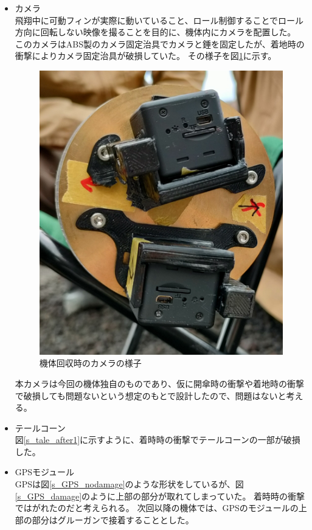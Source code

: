 \documentclass[a4paper,11pt,titlepage,uplatex]{jsarticle}
\begin{document}
\begin{itemize}
    \\
    \item カメラ\\
    飛翔中に可動フィンが実際に動いていること、ロール制御することでロール方向に回転しない映像を撮ることを目的に、機体内にカメラを配置した。
    このカメラはABS製のカメラ固定治具でカメラと錘を固定したが、着地時の衝撃によりカメラ固定治具が破損していた。
    その様子を図\ref{s_tyakuti_camera}に示す。
    \begin{figure}[H]
        \centering
        \includegraphics[scale = 0.1]{pic_str/s_tyakuti_camera.jpg}
        \caption{機体回収時のカメラの様子}
        \label{s_tyakuti_camera}
    \end{figure}
    本カメラは今回の機体独自のものであり、仮に開傘時の衝撃や着地時の衝撃で破損しても問題ないという想定のもとで設計したので、問題はないと考える。
    \\
    \item テールコーン\\
    図\ref{s_tale_after1}に示すように、着時時の衝撃でテールコーンの一部が破損した。
    \\
    \item GPSモジュール\\
    GPSは図\ref{s_GPS_nodamage}のような形状をしているが、図\ref{s_GPS_damage}のように上部の部分が取れてしまっていた。
    着時時の衝撃ではがれたのだと考えられる。
    次回以降の機体では、GPSのモジュールの上部の部分はグルーガンで接着することとした。
    

\end{itemize}
\end{document}
